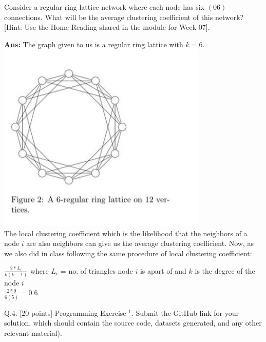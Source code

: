 \documentclass[answers]{exam}
\begin{document}
\begin{questions}
\begin{framed}
\end{framed}

    \question [10 points] Consider a regular ring lattice network where each node has six $(06)$ connections. What will be the average clustering coefficient of this network? [Hint: Use the Home Reading shared in the module for Week 07].
    
\begin{framed}
\newpage
\textbf{Ans:} 
The graph given to us is a regular ring lattice with $k=6$.\\
\includegraphics[width=10cm]{q3.jpeg}\\
The local clustering coefficient which is the likelihood that the neighbors of a node $i$ are also neighbors can give us the average clustering coefficient. Now, as we also did in class following the same procedure of local clustering coefficient:
\begin{center}
    $\frac{2 * L_i}{k(k-1)}$ where $L_i$ = no. of triangles node $i $ is apart of and $k$ is the degree of the node $i$\\
    $\frac{2*9}{6(5)} = 0.6$
\end{center}





\end{framed}

\question Q.4. [20 points] Programming Exercise $^{1}$. Submit the GitHub link for your solution, which should contain the source code, datasets generated, and any other relevant material).


\end{questions}
\end{document}
